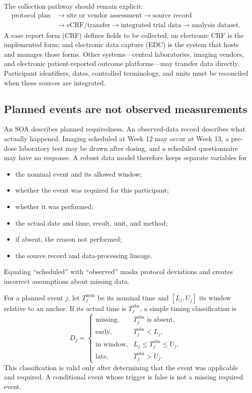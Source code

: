 \documentclass[12pt,oneside]{book}
\numberwithin{equation}{section}
\theoremstyle{definition}
\theoremstyle{plain}
\theoremstyle{remark}
\begin{document}
The collection pathway should remain explicit:
\[
\begin{aligned}
  \text{protocol plan}
  &\longrightarrow \text{site or vendor assessment}
  \longrightarrow \text{source record}\\
  &\longrightarrow \text{eCRF/transfer}
  \longrightarrow \text{integrated trial data}
  \longrightarrow \text{analysis dataset}.
\end{aligned}
\]
A case report form (CRF) defines fields to be collected; an electronic CRF is
the implemented form; and electronic data capture (EDC) is the system that
hosts and manages those forms.  Other systems---central laboratories, imaging
vendors, and electronic patient-reported outcome platforms---may transfer data
directly.  Participant identifiers, dates, controlled terminology, and units
must be reconciled when these sources are integrated.

\subsection{Planned events are not observed measurements}

An SOA describes planned requiredness.  An observed-data record describes what
actually happened.  Imaging scheduled at Week 12 may occur at Week 13, a
pre-dose laboratory test may be drawn after dosing, and a scheduled
questionnaire may have no response.  A robust data model therefore keeps
separate variables for
\begin{itemize}
    \item the nominal event and its allowed window;
    \item whether the event was required for this participant;
    \item whether it was performed;
    \item the actual date and time, result, unit, and method;
    \item if absent, the reason not performed;
    \item the source record and data-processing lineage.
\end{itemize}
Equating ``scheduled'' with ``observed'' masks protocol deviations and creates
incorrect assumptions about missing data.

For a planned event $j$, let $T_j^{\mathrm{nom}}$ be its nominal time and
$[L_j,U_j]$ its window relative to an anchor.  If its actual time is
$T_j^{\mathrm{obs}}$, a simple timing classification is
\[
  D_j=
  \begin{cases}
    \text{missing}, & T_j^{\mathrm{obs}}\text{ is absent},\\
    \text{early}, & T_j^{\mathrm{obs}}<L_j,\\
    \text{in window}, & L_j\le T_j^{\mathrm{obs}}\le U_j,\\
    \text{late}, & T_j^{\mathrm{obs}}>U_j.
  \end{cases}
\]
This classification is valid only after determining that the event was
applicable and required.  A conditional event whose trigger is false is not a
missing required event.
\end{document}
